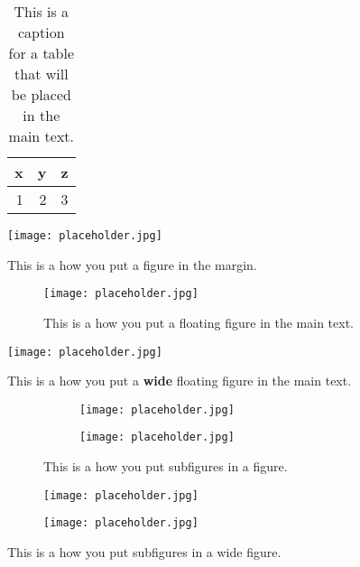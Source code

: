 \documentclass[10pt,oneside]{book}
\begin{document}
\begin{table}[bhpt]%
  \centering
  \begin{tabular}{rrr}
    \toprule
    x & y & z \\
    \midrule
    1 & 2 & 3 \\
    \bottomrule
  \end{tabular}
  \caption{This is a caption for a table that will be placed in the main text.}\label{tab:tableexample}
\end{table}


\begin{marginfigure}
  \texttt{[image: placeholder.jpg]}
  \caption{This is a how you put a figure in the margin.}
  \label{fig:marginfig}
\end{marginfigure}

\begin{figure}
  \centering
  \texttt{[image: placeholder.jpg]}
  \caption{This is a how you put a floating figure in the main text.}
  \label{fig:floatingfig}
\end{figure}

\begin{widefigure}
  \centering
  \texttt{[image: placeholder.jpg]}
  \caption{This is a how you put a \textbf{wide} floating figure in the main text.}
\end{widefigure}


\begin{figure}
    \centering
    \begin{subfigure}[b]{0.47\linewidth}
      \texttt{[image: placeholder.jpg]}
    \end{subfigure}
    \quad
    \begin{subfigure}[b]{0.47\linewidth}
      \texttt{[image: placeholder.jpg]}
    \end{subfigure}
  \caption{This is a how you put subfigures in a figure.}
\end{figure}


\begin{widefigure}
    \centering
    \begin{subfigure}[b]{0.45\linewidth}
      \texttt{[image: placeholder.jpg]}
    \end{subfigure}
    \qquad
    \begin{subfigure}[b]{0.45\linewidth}
      \texttt{[image: placeholder.jpg]}
    \end{subfigure}
  \caption{This is a how you put subfigures in a wide figure.}
\end{widefigure}
\end{document}
